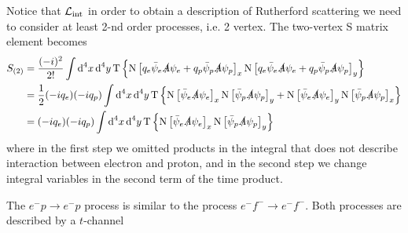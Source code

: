 \documentclass[TheoreticalPhy_ModB.tex]{subfiles}
\begin{document}
{\small Notice that $\mathcal L_{\textup{int}}$ in order to obtain a description of Rutherford scattering we need to consider at least 2-nd order processes, i.e. 2 vertex.}
The two-vertex S matrix element becomes
\begin{align*}
S_{(2)}&=\frac{(-i)^2}{2!}\int\textup{d}^4 x\,\textup{d}^4y\,\textup{T}\left\{\textup{N}\left[q_e\bar\psi_e\slashed A\psi_e+q_p\bar\psi_p\slashed A\psi_p\right]_x\textup{N}\left[q_e\bar\psi_e\slashed A\psi_e+q_p\bar\psi_p\slashed A\psi_p\right]_y\right\}\\
&=\frac12(-iq_e)(-iq_p)\int\textup{d}^4 x\,\textup{d}^4y\,\textup{T}\left\{\textup{N}\left[\bar\psi_e\slashed A\psi_e\right]_x\textup{N}\left[\bar\psi_p\slashed A\psi_p\right]_y+\textup{N}\left[\bar\psi_e\slashed A\psi_e\right]_y\textup{N}\left[\bar\psi_p\slashed A\psi_p\right]_x\right\}\\
&=(-iq_e)(-iq_p)\int\textup{d}^4 x\,\textup{d}^4y\,\textup{T}\left\{\textup{N}\left[\bar\psi_e\slashed A\psi_e\right]_x\textup{N}\left[\bar\psi_p\slashed A\psi_p\right]_y\right\}
\end{align*}
%
where in the first step we omitted products in the integral that does not describe interaction between electron and proton, and in the second step we change integral variables in the second term of the time product.

The $e^-p\rightarrow e^-p$  process is similar to the process $e^-f^-\rightarrow e^-f^-$. Both processes are described by a $t$-channel

\begin{figure}[H]
\centering
{}
\end{figure}
\end{document}
